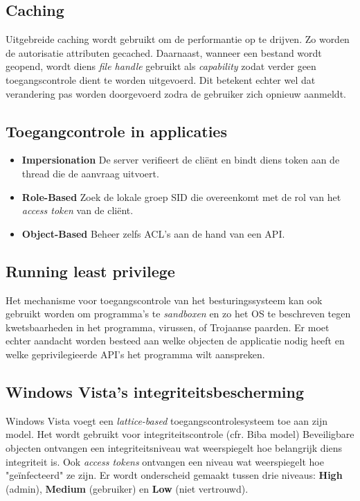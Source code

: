 \documentclass[../main.tex]{subfiles}
\begin{document}
\subsection{Caching}
Uitgebreide caching wordt gebruikt om de performantie op te drijven. Zo worden de autorisatie attributen gecached. Daarnaast, wanneer een bestand wordt  geopend, wordt diens \textit{file handle} gebruikt als \textit{capability} zodat verder geen toegangscontrole dient te worden uitgevoerd. Dit betekent echter wel dat verandering pas worden doorgevoerd zodra de gebruiker zich opnieuw aanmeldt.

\subsection{Toegangcontrole in applicaties}
\begin{itemize}
	\item \textbf{Impersionation} De server verifieert de cli\"ent en bindt diens token aan de thread die de aanvraag uitvoert.
	\item \textbf{Role-Based} Zoek de lokale groep SID die overeenkomt met de rol van het \textit{access token} van de cli\"ent.
	\item \textbf{Object-Based} Beheer zelfs ACL's aan de hand van een API.
\end{itemize}

\subsection{Running least privilege}
Het mechanisme voor toegangscontrole van het besturingssysteem kan ook gebruikt worden om programma's te \textit{sandboxen} en zo het OS te beschreven tegen kwetsbaarheden in het programma, virussen, of Trojaanse paarden. Er moet echter aandacht worden besteed aan welke objecten de applicatie nodig heeft en welke geprivilegieerde API's het programma wilt aanspreken.

\subsection{Windows Vista's integriteitsbescherming}
Windows Vista voegt een \textit{lattice-based} toegangscontrolesysteem toe aan zijn model. Het wordt gebruikt voor integriteitscontrole (cfr. Biba model) Beveiligbare objecten ontvangen een integriteitsniveau wat weerspiegelt hoe belangrijk diens integriteit is. Ook \textit{access tokens} ontvangen een niveau wat weerspiegelt hoe "ge\"infecteerd" ze zijn. Er wordt onderscheid gemaakt tussen drie niveaus: \textbf{High} (admin), \textbf{Medium} (gebruiker) en \textbf{Low} (niet vertrouwd).
\end{document}

